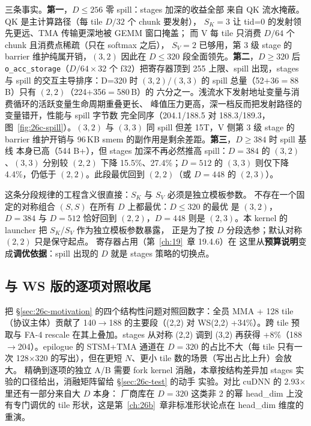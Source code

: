 三条事实。\textbf{第一}，$D\le256$ 零 spill：stages 加深的收益全部
来自 QK 流水掩蔽。QK 是主计算路径（每 tile $D/32$ 个 chunk 要发射），
$S_K{=}3$ 让 tid=0 的发射领先更远、TMA 传输更深地被 GEMM 窗口掩盖；
而 V 每 tile 只消费 $D/64$ 个 chunk 且消费点稀疏（只在 softmax 之后），
$S_V{=}2$ 已够用，第 3 级 stage 的 barrier 维护纯属开销，$(3,2)$
因此在 $D\le320$ 段全面领先。\textbf{第二}，$D\ge320$ 后
\texttt{o\_acc\_storage}（$D/64 \times 32$ 个 f32）把寄存器顶到 255
上限、spill 出现，stages 与 spill 的交互主导排序：D=320 时 $(3,2)/(3,3)$
的 spill 总量（52$+$36$=$88\,B）只有 $(2,2)$（224$+$356$=$580\,B）的
六分之一。浅流水下发射地址变量与消费循环的活跃变量生命周期重叠更长、
峰值压力更高，深一档反而把发射路径的变量错开，性能与 spill 字节数
完全同序（204.1/188.5 对 188.3/189.3，图~\ref{fig:26c-spill}）。$(3,2)$ 与
$(3,3)$ 同 spill 但差 15T，V 侧第 3 级 stage 的 barrier 维护开销与
96\,KB smem 的副作用是剩余差距。\textbf{第三}，$D\ge384$ 时 spill 基线
本身已高（544 B+），但 stages 加深不再必然推高 spill：$D{=}384$ 的
$(3,2)$、$(3,3)$ 分别较 $(2,2)$ 下降 15.5\%、27.4\%；$D{=}512$ 的
$(3,3)$ 则仅下降 4.4\%，仍低于 $(2,2)$。此段最优回到 $(2,2)$（或
$D{=}448$ 的 $(2,3)$）。

这条分段规律的工程含义很直接：$S_K$ 与 $S_V$ 必须是独立模板参数。
不存在一个固定的对称组合 $(S,S)$ 在所有 $D$ 上都最优：$D\le320$ 的最优
是 $(3,2)$，$D{=}384$ 与 $D{=}512$ 恰好回到 $(2,2)$，$D{=}448$ 则是
$(2,3)$。本 kernel 的 launcher 把 $S_K$/$S_V$ 作为独立模板参数暴露，
正是为了按 $D$ 分段选参；默认对称 $(2,2)$ 只是保守起点。
寄存器占用（第~\ref{ch:19}~章 19.4.6）在
这里从\textbf{预算说明}变成\textbf{调优依据}：spill 出现的 $D$ 就是 stages
策略的切换点。

\subsection{与 WS 版的逐项对照收尾}

把 \S\ref{sec:26c-motivation} 的四个结构性问题对照回数字：全员 MMA +
128 tile（协议主体）贡献了 140$\to$188 的主要段（(2,2) 对
WS(2,2) +34\%）。跨 tile 预取与 FA-4 rescale 在其上叠加。stages
从对称 (2,2) 调到 (3,2) 再获得 +8\%（188$\to$204）。epilogue 的
STSM+TMA 通道在 $D{=}320$ 的占比不大（每 tile 只有一次 128$\times$320
的写出），但在更短 $N$、更小 tile 数的场景（写出占比上升）会放大。
精确到逐项的独立 A/B 需要 fork kernel 消融，本章按结构差异加
stages 实验的口径给出，消融矩阵留给 \S\ref{sec:26c-test} 的动手
实验。对比 cuDNN 的 2.93$\times$ 里还有一部分来自大 $D$ 本身：
厂商库在 $D{=}320$ 这类非 2 的幂 head\_dim 上没有专门调优的 tile
形状，这是第~\ref{ch:26b}~章非标准形状论点在 head\_dim 维度的重演。

